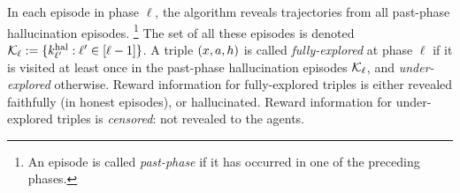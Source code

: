 In each episode in phase $\ell$,  the algorithm reveals trajectories from all past-phase hallucination episodes.%
\footnote{An episode is called \emph{past-phase} if it has occurred in one of the preceding phases.}
The set of all these episodes is denoted
    $\calK_{\ell} := \{\kexpl[\ell']: \ell' \in [\ell-1]\}$.
A triple $\xah$ is called \emph{fully-explored} at phase $\ell$  if it is visited at least once
in the past-phase hallucination episodes $\calK_{\ell}$, and \emph{under-explored} otherwise. Reward information for fully-explored triples is either revealed faithfully (in honest episodes), or hallucinated. Reward information for under-explored triples is \emph{censored}: not revealed to the agents.


